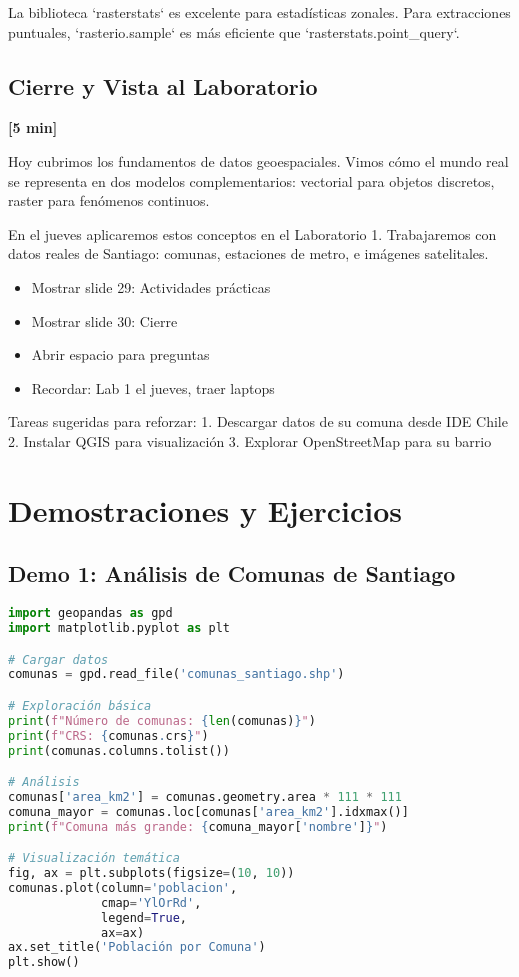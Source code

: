 \documentclass[11pt,a4paper]{article}
\newcommand{\tiempo}[1]{\textcolor{timecolor}{\textbf{[#1]}}}
\newcommand{\decir}[1]{\begin{tcolorbox}[colback=blue!5,colframe=usachblue,title={DECIR}]#1\end{tcolorbox}}
\newcommand{\hacer}[1]{\begin{tcolorbox}[colback=green!5,colframe=green!50!black,title={HACER}]#1\end{tcolorbox}}
\newcommand{\nota}[1]{\begin{tcolorbox}[colback=yellow!10,colframe=orange,title={NOTA}]#1\end{tcolorbox}}
\begin{document}
\nota{
La biblioteca `rasterstats` es excelente para estadísticas zonales. Para extracciones puntuales, `rasterio.sample` es más eficiente que `rasterstats.point_query`.
}

\subsection{Cierre y Vista al Laboratorio} \tiempo{5 min}

\decir{
Hoy cubrimos los fundamentos de datos geoespaciales. Vimos cómo el mundo real se representa en dos modelos complementarios: vectorial para objetos discretos, raster para fenómenos continuos.

En el jueves aplicaremos estos conceptos en el Laboratorio 1. Trabajaremos con datos reales de Santiago: comunas, estaciones de metro, e imágenes satelitales.
}

\hacer{
\begin{itemize}
    \item Mostrar slide 29: Actividades prácticas
    \item Mostrar slide 30: Cierre
    \item Abrir espacio para preguntas
    \item Recordar: Lab 1 el jueves, traer laptops
\end{itemize}
}

\nota{
Tareas sugeridas para reforzar:
1. Descargar datos de su comuna desde IDE Chile
2. Instalar QGIS para visualización
3. Explorar OpenStreetMap para su barrio
}

\newpage

\section{Demostraciones y Ejercicios}

\subsection{Demo 1: Análisis de Comunas de Santiago}

\begin{lstlisting}[language=Python]
import geopandas as gpd
import matplotlib.pyplot as plt

# Cargar datos
comunas = gpd.read_file('comunas_santiago.shp')

# Exploración básica
print(f"Número de comunas: {len(comunas)}")
print(f"CRS: {comunas.crs}")
print(comunas.columns.tolist())

# Análisis
comunas['area_km2'] = comunas.geometry.area * 111 * 111
comuna_mayor = comunas.loc[comunas['area_km2'].idxmax()]
print(f"Comuna más grande: {comuna_mayor['nombre']}")

# Visualización temática
fig, ax = plt.subplots(figsize=(10, 10))
comunas.plot(column='poblacion', 
             cmap='YlOrRd',
             legend=True,
             ax=ax)
ax.set_title('Población por Comuna')
plt.show()
\end{lstlisting}
\end{document}
